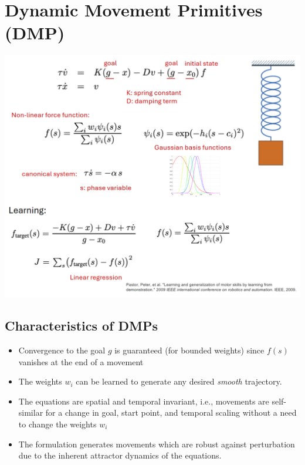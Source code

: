 \documentclass[10pt]{article}
\begin{document}
\section*{Dynamic Movement Primitives (DMP)}
\begin{center} 
	\includegraphics*[width=\textwidth]{L1_6.png} 
\end{center}

\subsection*{Characteristics of DMPs}
\begin{itemize}
	\item Convergence to the goal $g$ is guaranteed (for bounded weights) since $f(s)$ vanishes at the end of a movement
	\item The weights $w_i$ can be learned to generate any desired \textit{smooth} trajectory.
	\item The equations are spatial and temporal invariant, i.e., movements are self-similar for a change in goal, start point, and temporal scaling without a need to change the weights $w_i$
	\item The formulation generates movements which are robust against perturbation due to the inherent attractor dynamics of the equations.
\end{itemize}
    
\end{document}
